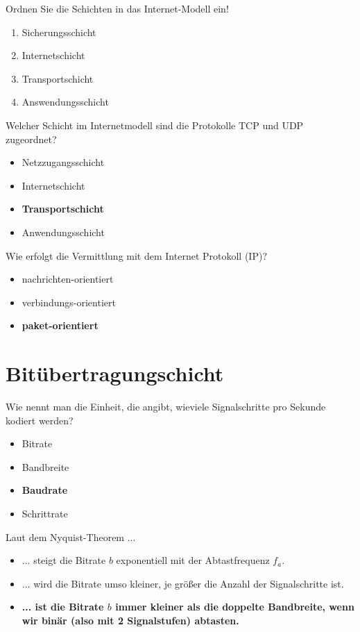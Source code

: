 \documentclass{article}
\begin{document}
 	Ordnen Sie die Schichten in das Internet-Modell ein! 
 	\begin{enumerate}
 		\item Sicherungsschicht
 		\item Internetschicht
 		\item Transportschicht
 		\item Answendungsschicht
 	\end{enumerate}
 
 	Welcher Schicht im Internetmodell sind die Protokolle TCP und UDP zugeordnet?
 	\begin{itemize}
 		\item Netzzugangsschicht
 		\item Internetschicht
 		\item \textbf{Transportschicht}
 		\item Anwendungsschicht
 	\end{itemize}
 
 	Wie erfolgt die Vermittlung mit dem Internet Protokoll (IP)?
 	\begin{itemize}
 		\item nachrichten-orientiert
 		\item verbindungs-orientiert 
 		\item \textbf{paket-orientiert}
 	\end{itemize}
	
	\section{Bitübertragungschicht}
	
	Wie nennt man die Einheit, die angibt, wieviele Signalschritte pro Sekunde kodiert werden?
	\begin{itemize}
		\item Bitrate
		\item Bandbreite
		\item \textbf{Baudrate}
		\item Schrittrate
	\end{itemize}

	Laut dem Nyquist-Theorem ... 
	\begin{itemize}
		\item ... steigt die Bitrate $b$ exponentiell mit der Abtastfrequenz $f_a$.
		\item  ... wird die Bitrate umso kleiner, je größer die Anzahl der Signalschritte ist. 
		\item \textbf{... ist die Bitrate $b$ immer kleiner als die doppelte Bandbreite, wenn wir binär (also mit 2 Signalstufen) abtasten.} 
	\end{itemize}
\end{document}
